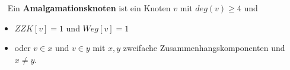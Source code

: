 \begin{defi}[Amalgamationsknoten]~\newline
Ein \textbf{Amalgamationsknoten} ist ein Knoten $v$ mit $deg(v)\geq 4$ und 
\begin{itemize}
\item $ZZK[v]=1$ und $Weg[v]=1$
\item oder $v \in x$ und $v \in y$ mit $x,y$ zweifache Zusammenhangskomponenten und $x \neq y$.
\end{itemize}
\end{defi}
\newpage
